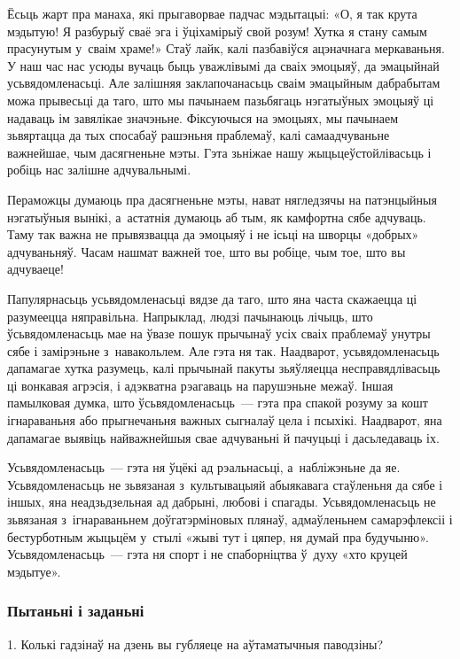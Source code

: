 Ёсьць жарт пра манаха, які прыгаворвае падчас мэдытацыі: «О, я так крута мэдытую! Я разбурыў сваё эга і ўціхамірыў свой розум! Хутка я стану самым прасунутым у~сваім храме!» Стаў лайк, калі пазбавіўся ацэначнага меркаваньня. У наш час нас усюды вучаць быць уважлівымі да сваіх эмоцыяў, да эмацыйнай усьвядомленасьці. Але залішняя заклапочанасьць сваім эмацыйным дабрабытам можа прывесьці да таго, што мы пачынаем пазьбягаць нэгатыўных эмоцыяў ці надаваць ім завялікае значэньне. Фіксуючыся на эмоцыях, мы пачынаем зьвяртацца да тых спосабаў рашэньня праблемаў, калі самаадчуваньне важнейшае, чым дасягненьне мэты. Гэта зьніжае нашу жыцьцеўстойлівасьць і робіць нас залішне адчувальнымі.

Пераможцы думаюць пра дасягненьне мэты, нават нягледзячы на патэнцыйныя нэгатыўныя вынікі, а~астатнія думаюць аб тым, як камфортна сябе адчуваць. Таму так важна не прывязвацца да эмоцыяў і не ісьці на шворцы «добрых» адчуваньняў. Часам нашмат важней тое, што вы робіце, чым тое, што вы адчуваеце!

Папулярнасьць усьвядомленасьці вядзе да таго, што яна часта скажаецца ці разумеецца няправільна. Напрыклад, людзі пачынаюць лічыць, што ўсьвядомленасьць мае на ўвазе пошук прычынаў усіх сваіх праблемаў унутры сябе і замірэньне з~навакольлем. Але гэта ня так. Наадварот, усьвядомленасьць дапамагае хутка разумець, калі прычынай пакуты зьяўляецца несправядлівасьць ці вонкавая агрэсія, і адэкватна рэагаваць на парушэньне межаў. Іншая памылковая думка, што ўсьвядомленасьць~--- гэта пра спакой розуму за кошт ігнараваньня або прыгнечаньня важных сыгналаў цела і псыхікі. Наадварот, яна дапамагае выявіць найважнейшыя свае адчуваньні й пачуцьці і дасьледаваць іх.

Усьвядомленасьць~--- гэта ня ўцёкі ад рэальнасьці, а~набліжэньне да яе. Усьвядомленасьць не зьвязаная з~культывацыяй абыякавага стаўленьня да сябе і іншых, яна неадзьдзельная ад дабрыні, любові і спагады. Усьвядомленасьць не зьвязаная з~ігнараваньнем доўгатэрміновых плянаў, адмаўленьнем самарэфлексіі і бестурботным жыцьцём у~стылі «жыві тут і цяпер, ня думай пра будучыню». Усьвядомленасьць~--- гэта ня спорт і не спаборніцтва ў~духу «хто круцей мэдытуе».

\subsubsection{Пытаньні і заданьні}

1. Колькі гадзінаў на дзень вы губляеце на аўтаматычныя паводзіны?

